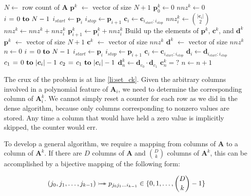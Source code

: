 \documentclass{article}
\begin{document}
\begin{codebox}
\footnotesize
{}
    \li $N \gets$ row count of $\bm{A}$
    \li $\bm{p}^k$ $\gets$ vector of size $N+1$
    \li $\bm{p}^k_0 \gets 0$
    \li $nnz^k \gets 0$
    \li \For $i \gets 0 \To N-1$ \Do
    \li     $i_{start} \gets \bm{p}_i$
    \li     $i_{stop} \gets \bm{p}_{i+1}$
    \li     $\bm{c}_i \gets \bm{c}_{i_{start}:i_{stop}}$
    \li     $nnz^k_i \gets \binom{|\bm{c}_i|}{2}$ \label{li:row_nnz_count}
    \li     $nnz^k \gets nnz^k + nnz^k_i$
    \li     $\bm{p}^k_{i+1} \gets \bm{p}^k_i + nnz^k_i$
        \End
    \zi     
    \zi \Comment Build up the elements of $\bm{p}^k$, $\bm{c}^k$, and $\bm{d}^k$
    \li $\bm{p}^k$ $\gets$ vector of size $N+1$
    \li $\bm{c}^k$ $\gets$ vector of size $nnz^k$
    \li $\bm{d}^k$ $\gets$ vector of size $nnz^k$
    \li $n \gets 0$
    \li \For $i \gets 0 \To N-1$ \Do
    \li     $i_{start} \gets \bm{p}_i$
    \li     $i_{stop} \gets \bm{p}_{i+1}$
    \li     $\bm{c}_i \gets \bm{c}_{i_{start}:i_{stop}}$
    \li     $\bm{d}_i \gets \bm{d}_{i_{start}:i_{stop}}$
    \li     \For $c_1 \gets 0 \To |\bm{c}_i|-1$ \Do
    \li         \For $c_2 \gets c_1 \To |\bm{c}_i|-1$ \Do
    \li             $\bm{d}^k_{n} \gets \bm{d}_{c_0} \cdot \bm{d}_{c_1}$
    \li             $\bm{c}^k_{n} = ?$ \label{li:set_ck}
    \li             $n \gets n + 1$
                \End
            \End
       	\End
\end{codebox}

The crux of the problem is at line \ref{li:set_ck}.
Given the arbitrary columns involved in a polynomial feature of $\bm{A}_i$, we need to determine the corresponding column of $\bm{A}^k_i$.
We cannot simply reset a counter for each row as we did in the dense algorithm,  because only columns corresponding to nonzero values are stored.
Any time a column that would have held a zero value is implicitly skipped, the counter would err.

To develop a general algorithm, we require a mapping from columns of $\bm{A}$ to a column of $\bm{A}^k$.
If there are $D$ columns of $\bm{A}$ and $\binom{D}{k}$ columns of $\bm{A}^k$, this can be accomplished by a bijective mapping of the following form:

\begin{equation}
(j_0, j_1, \dots, j_{k-1}) \rightarrowtail \hspace{-1.9ex} \twoheadrightarrow p_{j_0j_1 \dots i_{k-1}} \in \{0,1,\dots,\binom{D}{k}-1\} 
\end{equation}
\end{document}
